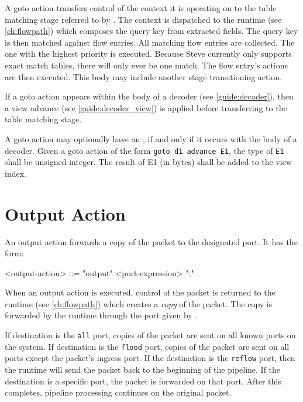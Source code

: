 A goto action transfers control of the context it is operating on to the table matching stage referred to by . The context is dispatched to the runtime (see \ref{ch:flowpath}) which composes the query key from extracted fields. The query key is then matched against flow entries. All matching flow entries are collected. The one with the highest priority is executed. Because Steve currently only supports exact match tables, there will only ever be one match. The flow entry's actions are then executed. This body may include another stage transitioning action.

If a goto action appears within the body of a decoder (see \ref{guide:decoder}), then a view advance (see \ref{guide:decoder_view}) is applied before transferring to the table matching stage.

A goto action may optionally have an , if and only if it occurs with the body of a decoder. Given a goto action of the form \texttt{goto d1 advance E1}, the type of \texttt{E1} shall be unsigned integer. The result of E1 (in bytes) shall be added to the view index.

\section{Output Action} \label{guide:output}

An output action forwards a copy of the packet to the designated port. It has the form:

\begin{minip}
\begin{grammar}
<output-action> ::= "output" <port-expression> ";"
\end{grammar}
\end{minip}

When an output action is executed, control of the packet is returned to the runtime (see \ref{ch:flowpath}) which creates a \textit{copy} of the packet. The copy is forwarded by the runtime through the port given by .

If destination is the \texttt{all} port, copies of the packet are sent on all known ports on the system. If destination is the \texttt{flood} port, copies of the packet are sent on all ports except the packet's ingress port. If the destination is the \texttt{reflow} port, then the runtime will send the packet back to the beginning of the pipeline. If the destination is a specific port, the packet is forwarded on that port. After this completes, pipeline processing continues on the original packet.

